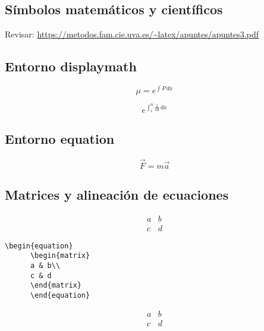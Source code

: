 \subsection{Símbolos matemáticos y científicos}
Revisar: \url{https://metodos.fam.cie.uva.es/~latex/apuntes/apuntes3.pdf}

\subsection{Entorno displaymath}
\begin{displaymath}
  \mu = e^{\int P \, dx}
\end{displaymath}

\begin{displaymath}
  e^{\displaystyle\int_{i}^{n} \frac{1}{cd} \, dx}
\end{displaymath}

\subsection{Entorno equation}
\begin{equation}
  \vec{F} = m \vec{a}
  \label{ec:2new}
\end{equation}

\subsection{Matrices y alineación de ecuaciones}

\begin{equation}
  \begin{matrix}
    a & b\\
    c & d
  \end{matrix}
\end{equation}


\begin{minipage}{0.5\textwidth}
  \begin{lstlisting}[caption = Matrix 01]
    \begin{equation}
      \begin{matrix}
      a & b\\
      c & d
      \end{matrix}
      \end{equation}
    \end{lstlisting}
\end{minipage}
\begin{minipage}{0.5\textwidth}
  \begin{equation}
    \begin{matrix}
    a & b\\
    c & d
    \end{matrix}
    \end{equation}
\end{minipage}


